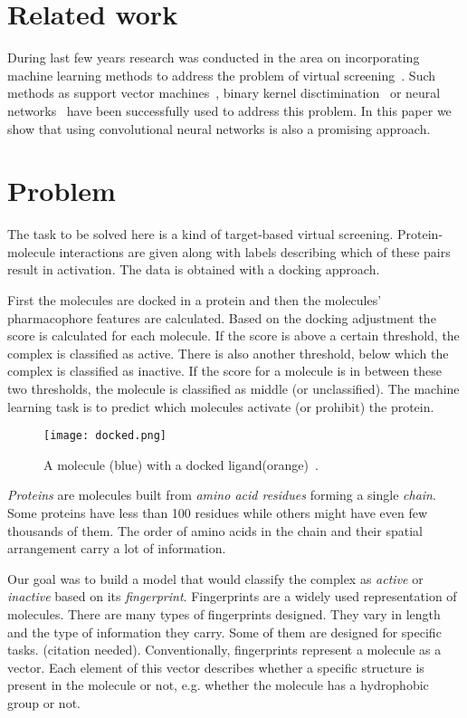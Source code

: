 \documentclass[a4paper,10pt]{report}
\begin{document}
    \section{Related work}
    During last few years research was conducted in the area on incorporating machine learning methods to address the problem of virtual screening~\cite{kernel_biology, evaluation2007, MLforINSilicio}. Such methods as support vector machines~\cite{SVM}, binary kernel disctimination~\cite{BKD} or neural networks~\cite{NN_VS} have been successfully used to address this problem. In this paper we show that using convolutional neural networks is also a promising approach.

    \section{Problem}\label{sec:PROBLEM}
    The task to be solved here is a kind of target-based virtual screening. Protein-molecule interactions are given along with labels describing which of these pairs result in activation. The data is obtained with a docking approach.
    
    First the molecules are docked in a protein and then the molecules' pharmacophore features are calculated. Based on the docking adjustment the score is calculated for each molecule. If the score is above a certain threshold, the complex is classified as active. There is also another threshold, below which the complex is classified as inactive. If the score for a molecule is in between these two thresholds, the molecule is classified as middle (or unclassified). The machine learning task is to predict which molecules activate (or prohibit) the protein.
    
    \begin{figure}[h!]
	  \centering
	  \texttt{[image: docked.png]}
	  \caption{A molecule (blue) with a docked ligand(orange)~\cite{docked}.}
	  \label{docked}
    \end{figure} 
    
    \emph{Proteins} are molecules built from \emph{amino acid residues} forming a single \emph{chain}. Some proteins have less than 100 residues while others might have even few thousands of them. The order of amino acids in the chain and their spatial arrangement carry a lot of information. 
    
    Our goal was to build a model that would classify the complex as \emph{active} or \emph{inactive} based on its \emph{fingerprint}. Fingerprints are a widely used representation of molecules. There are many types of fingerprints designed. They vary in length and the type of information they carry. Some of them are designed for specific tasks. (citation needed). Conventionally, fingerprints represent a molecule as a vector. Each element of this vector describes whether a specific structure is present in the molecule or not, e.g. whether the molecule has a hydrophobic group or not. 
        
\end{document}
